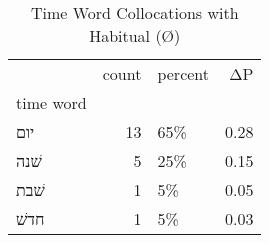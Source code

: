 \begin{table}[htbp!]
\centering
\caption{Time Word Collocations with Habitual (Ø)}
\label{table:habØ_head_cpd}
\begin{tabular}{lrlr}
\toprule
{} &  count & percent &    ΔP \\
time word &        &         &       \\
\midrule
יום       &     13 &     65\% &  0.28 \\
שׁנה      &      5 &     25\% &  0.15 \\
שׁבת      &      1 &      5\% &  0.05 \\
חדשׁ      &      1 &      5\% &  0.03 \\
\bottomrule
\end{tabular}
\end{table}
